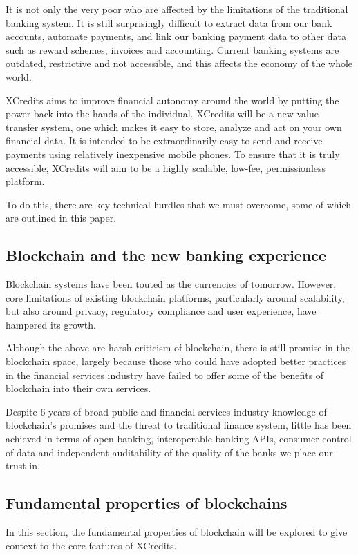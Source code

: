 \documentclass[a4paper,12pt]{article}
\begin{document}
It is not only the very poor who are affected by the limitations of the traditional banking system. It is still surprisingly difficult to extract data from our bank accounts, automate payments, and link our banking payment data to other data such as reward schemes, invoices and accounting. Current banking systems are outdated, restrictive and not accessible, and this affects the economy of the whole world. 

XCredits aims to improve financial autonomy around the world by putting the power back into the hands of the individual. XCredits will be a new value transfer system, one which makes it easy to store, analyze and act on your own financial data. It is intended to be extraordinarily easy to send and receive payments using relatively inexpensive mobile phones. To ensure that it is truly accessible, XCredits will aim to be a highly scalable, low-fee, permissionless platform.

To do this, there are key technical hurdles that we must overcome, some of which are outlined in this paper.

\subsection{Blockchain and the new banking experience}
Blockchain systems have been touted as the currencies of tomorrow. However, core limitations of existing blockchain platforms, particularly around scalability, but also around privacy, regulatory compliance and user experience, have hampered its growth. 

Although the above are harsh criticism of blockchain, there is still promise in the blockchain space, largely because those who could have adopted better practices in the financial services industry have failed to offer some of the benefits of blockchain into their own services.

Despite 6 years of broad public and financial services industry knowledge of blockchain's promises and the threat to traditional finance system, little has been achieved in terms of open banking, interoperable banking APIs, consumer control of data and independent auditability of the quality of the banks we place our trust in. 

\subsection{Fundamental properties of blockchains}
In this section, the fundamental properties of blockchain will be explored to give context to the core features of XCredits. 
\end{document}
